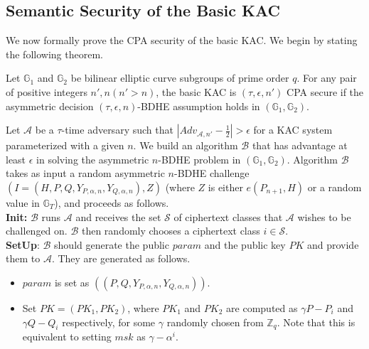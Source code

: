 \subsection{Semantic Security of the Basic KAC}
\label{subsec:proof_basic}

We now formally prove the CPA security of the basic KAC. We begin by stating the following theorem.

\begin{Theorem}
\label{th:basicCPA}
Let $\mathbb{G}_1$ and $\mathbb{G}_2$ be bilinear elliptic curve subgroups of prime order $q$. For any pair of positive integers $n',n (n'>n)$, the basic KAC is $(\tau,\epsilon,n')$ CPA secure if the asymmetric decision $(\tau,\epsilon,n)$-BDHE assumption holds in $(\mathbb{G}_1,\mathbb{G}_2)$.
\end{Theorem}

 Let $\mathcal{A}$ be a $\tau$-time adversary such that $|Adv_{\mathcal{A},n'}-\frac{1}{2}| > \epsilon$ for a KAC system parameterized with a given $n$. We build an algorithm $\mathcal{B}$ that has advantage at least $\epsilon$ in solving the asymmetric $n$-BDHE problem in $(\mathbb{G}_1,\mathbb{G}_2)$. Algorithm $\mathcal{B}$ takes as input a random asymmetric $n$-BDHE challenge $(I=(H,P,Q,Y_{P,\alpha,n},Y_{Q,\alpha,n}),Z)$ (where $Z$ is either ${e}(P_{n+1},H)$ or a random value in $\mathbb{G}_T$), and proceeds as follows.\\

\noindent \textbf{Init:} $\mathcal{B}$ runs $\mathcal{A}$ and receives the set $\mathcal{S}$ of ciphertext classes that $\mathcal{A}$ wishes to be challenged on. $\mathcal{B}$ then randomly chooses a ciphertext class $i\in\mathcal{S}$.\\
 
\noindent \textbf{SetUp}: $\mathcal{B}$ should generate the public $param$ and the public key $PK$  and provide them to $\mathcal{A}$. They are generated as follows.
\begin{itemize}
  \item $param$ is set as $((P,Q,Y_{P,\alpha,n},Y_{Q,\alpha,n}))$.
  \item Set $PK=(PK_1,PK_2)$, where $PK_1$ and $PK_2$ are computed as $\gamma P - P_i$ and $\gamma Q-Q_i$ respectively, for some $\gamma$ randomly chosen from $\mathbb{Z}_q$. Note that this is equivalent to setting $msk$ as $\gamma-\alpha^i$.
  
\end{itemize}
 
